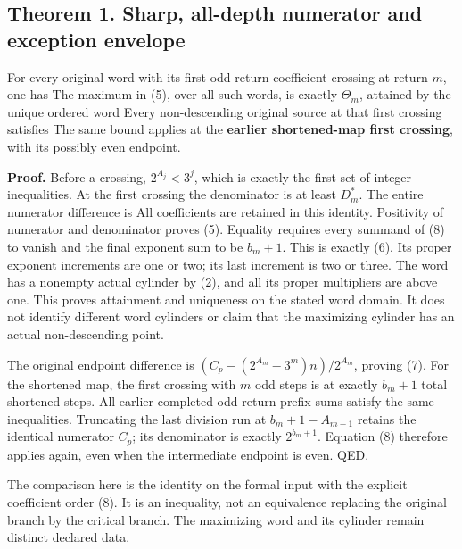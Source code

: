 \subsection{Theorem 1. Sharp, all-depth numerator and exception
envelope}

For every original word with its first odd-return coefficient crossing
at return \(m\), one has
 The maximum in (5), over
all such words, is exactly \(\Theta_m\), attained by the unique ordered
word
Every non-descending original source at that first crossing satisfies
 The same bound applies at
the \textbf{earlier shortened-map first crossing}, with its possibly
even endpoint.

\textbf{Proof.} Before a crossing, \(2^{A_j}<3^j\), which is exactly the
first set of integer inequalities. At the first crossing the denominator
is at least \(D_m^*\). The entire numerator difference is
All coefficients are retained in this identity. Positivity of numerator
and denominator proves (5). Equality requires every summand of (8) to
vanish and the final exponent sum to be \(b_m+1\). This is exactly (6).
Its proper exponent increments are one or two; its last increment is two
or three. The word has a nonempty actual cylinder by (2), and all its
proper multipliers are above one. This proves attainment and uniqueness
on the stated word domain. It does not identify different word cylinders
or claim that the maximizing cylinder has an actual non-descending
point.

The original endpoint difference is \((C_p-(2^{A_m}-3^m)n)/2^{A_m}\),
proving (7). For the shortened map, the first crossing with \(m\) odd
steps is at exactly \(b_m+1\) total shortened steps. All earlier
completed odd-return prefix sums satisfy the same inequalities.
Truncating the last division run at \(b_m+1-A_{m-1}\) retains the
identical numerator \(C_p\); its denominator is exactly \(2^{b_m+1}\).
Equation (8) therefore applies again, even when the intermediate
endpoint is even. QED.

The comparison here is the identity on the formal input with the
explicit coefficient order (8). It is an inequality, not an equivalence
replacing the original branch by the critical branch. The maximizing
word and its cylinder remain distinct declared data.

